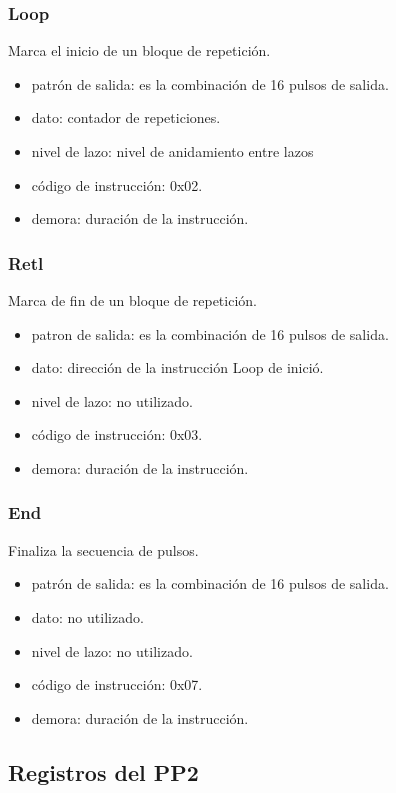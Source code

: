 \subsubsection{Loop}
Marca el inicio de un bloque de repetici\'on.
\begin{itemize}
    \item patr\'on de salida: es la combinaci\'on de 16 pulsos de salida.
    \item dato: contador de repeticiones.
    \item nivel de lazo: nivel de anidamiento entre lazos
    \item c\'odigo de instrucci\'on: 0x02.
    \item demora: duraci\'on de la instrucci\'on.
\end{itemize}

\subsubsection{Retl}
Marca de fin de un bloque de repetici\'on.
\begin{itemize}
    \item patron de salida: es la combinaci\'on de 16 pulsos de salida.
    \item dato: direcci\'on de la instrucci\'on Loop de inici\'o.
    \item nivel de lazo: no utilizado.
    \item c\'odigo de instrucci\'on: 0x03.
    \item demora: duraci\'on de la instrucci\'on.
\end{itemize}

\subsubsection{End}
Finaliza la secuencia de pulsos.
\begin{itemize}
    \item patr\'on de salida: es la combinaci\'on de 16 pulsos de salida.
    \item dato: no utilizado.
    \item nivel de lazo: no utilizado.
    \item c\'odigo de instrucci\'on: 0x07.
    \item demora: duraci\'on de la instrucci\'on.
\end{itemize}

\subsection{Registros del PP2}

